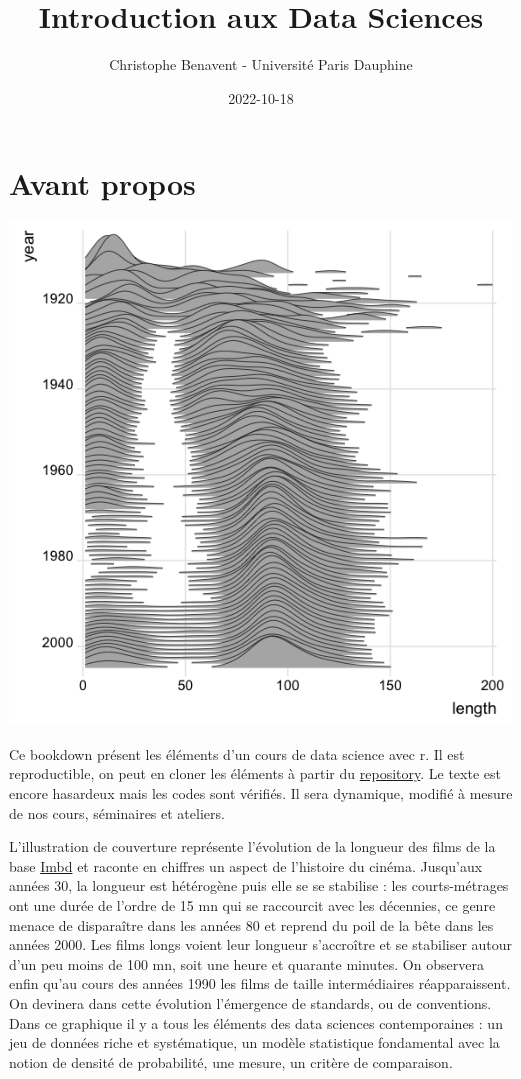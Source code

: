 \documentclass[
]{book}
\title{Introduction aux Data Sciences}
\author{Christophe Benavent - Université Paris Dauphine}
\date{2022-10-18}
\begin{document}
\maketitle

{
\setcounter{tocdepth}{1}
\tableofcontents
}
\hypertarget{avant-propos}{%
\chapter{Avant propos}\label{avant-propos}}

\includegraphics{./Images/ggridge.png}

Ce bookdown présent les éléments d'un cours de data science avec r. Il est reproductible, on peut en cloner les éléments à partir du \href{https://github.com/BenaventC/DataScienceBook}{repository}. Le texte est encore hasardeux mais les codes sont vérifiés. Il sera dynamique, modifié à mesure de nos cours, séminaires et ateliers.

L'illustration de couverture représente l'évolution de la longueur des films de la base \href{https://www.imdb.com/}{Imbd} et raconte en chiffres un aspect de l'histoire du cinéma. Jusqu'aux années 30, la longueur est hétérogène puis elle se se stabilise : les courts-métrages ont une durée de l'ordre de 15 mn qui se raccourcit avec les décennies, ce genre menace de disparaître dans les années 80 et reprend du poil de la bête dans les années 2000. Les films longs voient leur longueur s'accroître et se stabiliser autour d'un peu moins de 100 mn, soit une heure et quarante minutes. On observera enfin qu'au cours des années 1990 les films de taille intermédiaires réapparaissent. On devinera dans cette évolution l'émergence de standards, ou de conventions. Dans ce graphique il y a tous les éléments des data sciences contemporaines : un jeu de données riche et systématique, un modèle statistique fondamental avec la notion de densité de probabilité, une mesure, un critère de comparaison.
\end{document}
